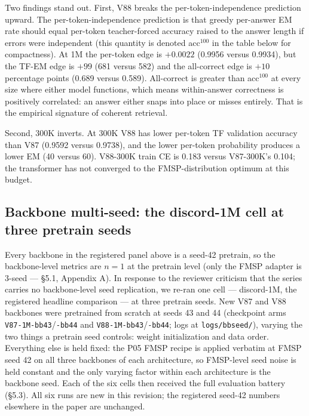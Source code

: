 \documentclass[11pt]{article}
\begin{document}
Two findings stand out. First, V88 breaks the per-token-independence prediction upward. The per-token-independence prediction is that greedy per-answer EM rate should equal per-token teacher-forced accuracy raised to the answer length if errors were independent (this quantity is denoted acc$^{100}$ in the table below for compactness). At 1M the per-token edge is $+0.0022$ (0.9956 versus 0.9934), but the TF-EM edge is $+99$ (681 versus 582) and the all-correct edge is $+10$ percentage points (0.689 versus 0.589). All-correct is greater than acc$^{100}$ at every size where either model functions, which means within-answer correctness is positively correlated: an answer either snaps into place or misses entirely. That is the empirical signature of coherent retrieval.

Second, 300K inverts. At 300K V88 has lower per-token TF validation accuracy than V87 (0.9592 versus 0.9738), and the lower per-token probability produces a lower EM (40 versus 60). V88-300K train CE is 0.183 versus V87-300K's 0.104; the transformer has not converged to the FMSP-distribution optimum at this budget.

\subsection{Backbone multi-seed: the discord-1M cell at three pretrain seeds}

Every backbone in the registered panel above is a seed-42 pretrain, so the backbone-level metrics are $n = 1$ at the pretrain level (only the FMSP adapter is 3-seed --- \S5.1, Appendix A). In response to the reviewer criticism that the series carries no backbone-level seed replication, we re-ran one cell --- discord-1M, the registered headline comparison --- at three pretrain seeds. New V87 and V88 backbones were pretrained from scratch at seeds 43 and 44 (checkpoint arms \texttt{V87-1M-bb43}/\texttt{-bb44} and \texttt{V88-1M-bb43}/\texttt{-bb44}; logs at \texttt{logs/bbseed/}), varying the two things a pretrain seed controls: weight initialization and data order. Everything else is held fixed: the P05 FMSP recipe is applied verbatim at FMSP seed 42 on all three backbones of each architecture, so FMSP-level seed noise is held constant and the only varying factor within each architecture is the backbone seed. Each of the six cells then received the full evaluation battery (\S5.3). All six runs are new in this revision; the registered seed-42 numbers elsewhere in the paper are unchanged.
\end{document}
